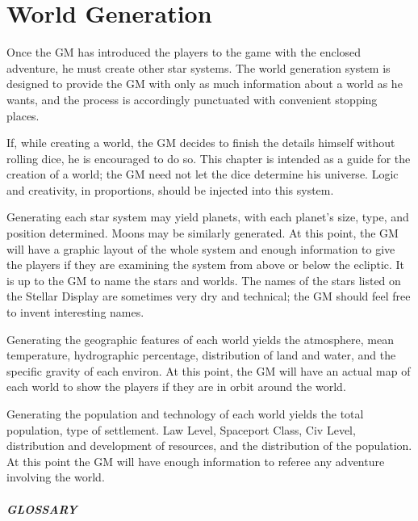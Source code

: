 

\chapter{World Generation}
\label{cha:world-generation}


Once the GM has introduced the players to the game with the enclosed
adventure, he must create other star systems. The world generation
system is designed to provide the GM with only as much information
about a world as he wants, and the process is accordingly punctuated
with convenient stopping places.

If, while creating a world, the GM decides to finish the details
himself without rolling dice, he is encouraged to do so. This chapter
is intended as a guide for the creation of a world; the GM need not
let the dice determine his universe. Logic and creativity, in
proportions, should be injected into this system.

Generating each star system may yield planets, with each planet's
size, type, and position determined. Moons may be similarly generated.
At this point, the GM will have a graphic layout of the whole system
and enough information to give the players if they are examining the
system from above or below the ecliptic. It is up to the GM to name
the stars and worlds. The names of the stars listed on the Stellar
Display are sometimes very dry and technical; the GM should feel free
to invent interesting names.

Generating the geographic features of each world yields the
atmosphere, mean temperature, hydrographic percentage, distribution of
land and water, and the specific gravity of each environ. At this
point, the GM will have an actual map of each world to show the
players if they are in orbit around the world.

Generating the population and technology of each world yields the
total population, type of settlement. Law Level, Spaceport Class, Civ
Level, distribution and development of resources, and the distribution
of the population. At this point the GM will have enough information
to referee any adventure involving the world.


\paragraph{GLOSSARY}

